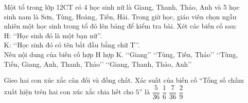 

\begin{ex}%
	Một tổ trong lớp 12CT có 4  học sinh nữ là Giang, Thanh, Thảo, Anh và 5 học sinh nam là Sơn, Tùng, Hoàng, Tiến, Hải. Trong giờ học, giáo viên chọn ngẫu nhiên một học sinh trong tổ đó lên bảng để kiểm tra bài. Xét các biến cố sau:\\
	H: \lq\lq Học sinh đó  là một bạn nữ\rq\rq .\\
	K: \lq\lq  Học sinh đó có tên bắt đầu bằng chữ T\rq\rq .\\
	Nêu  nội dung của biến cố hợp H hợp K.
	 \choice
		 {\lq\lq Giang\rq\rq}
		{\lq\lq Tùng, Tiến, Thảo\rq\rq} 
		{\True \lq\lq  Tùng, Tiến, Giang, Anh, Thanh, Thảo\rq\rq}
		{\lq\lq Giang,  Thanh, Thảo, Anh\rq\rq}
\end{ex}

\begin{ex}%
	Gieo hai con xúc xắc cân đối và  đồng chất. Xác suất của biến cố ``Tổng số chấm xuất hiện trên hai con xúc xắc chia hết cho $5$'' là
	\choice 
		{$\dfrac{5}{36}$} 
		 {$\dfrac{1}{6}$}
		 {\True $\dfrac{7}{36}$}
		 {$\dfrac{2}{9}$}
\end{ex}



